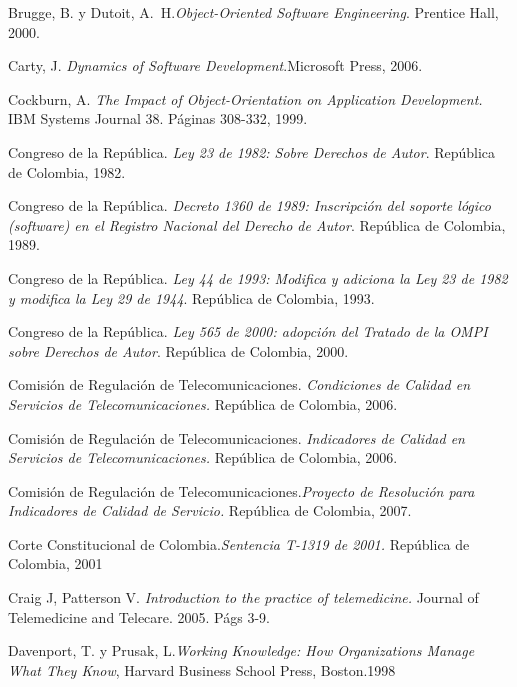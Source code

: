 \begin{thebibliography}{}
 Brugge, B. y Dutoit, A.~H.\textit{Object-Oriented Software Engineering}. Prentice Hall, 2000.

 Carty, J. \textit{Dynamics of Software Development}.Microsoft Press, 2006.

 Cockburn, A. \textit{The Impact of Object-Orientation on Application Development.} IBM Systems Journal 38. Páginas 308-332, 1999.

 Congreso de la República. \textit{Ley 23 de 1982: Sobre Derechos de Autor}. República de Colombia, 1982.

 Congreso de la República. \textit{Decreto 1360 de 1989: Inscripción del soporte lógico (software) en el Registro Nacional del Derecho de Autor}. República de Colombia, 1989.

 Congreso de la República. \textit{Ley 44 de 1993: Modifica y adiciona la Ley 23 de 1982 y modifica la Ley 29 de 1944}. República de Colombia, 1993.

 Congreso de la República. \textit{Ley 565 de 2000: adopción del Tratado de la OMPI sobre Derechos de Autor}. República de Colombia, 2000.

 Comisión de Regulación de Telecomunicaciones. \textit{Condiciones de Calidad en Servicios de Telecomunicaciones.} República de Colombia, 2006. 

 Comisión de Regulación de Telecomunicaciones. \textit{Indicadores de Calidad en Servicios de Telecomunicaciones.} República de Colombia, 2006. 

 Comisión de Regulación de Telecomunicaciones.\textit{Proyecto de Resolución para Indicadores de Calidad de Servicio.} República de Colombia, 2007.

 Corte Constitucional de Colombia.\textit{Sentencia T-1319 de 2001.} República de Colombia, 2001

 Craig J, Patterson V. \textit{Introduction to the practice of telemedicine.} Journal of Telemedicine and Telecare. 2005. Págs 3-9.

 Davenport, T. y Prusak, L.\textit{Working Knowledge: How Organizations Manage What They Know}, Harvard Business School Press, Boston.1998


\end{thebibliography}
